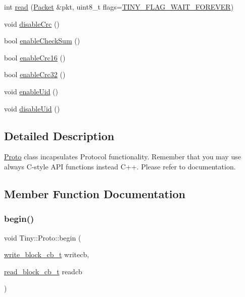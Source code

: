 \begin{DoxyCompactItemize}
\item 
int \hyperlink{classTiny_1_1Proto_aedef629f8b8968db7c8693bb45039651}{read} (\hyperlink{classTiny_1_1Packet}{Packet} \&pkt, uint8\+\_\+t flags=\hyperlink{group__FLAGS__GROUP_ga3a34267804581c5709d03f52d232b307}{T\+I\+N\+Y\+\_\+\+F\+L\+A\+G\+\_\+\+W\+A\+I\+T\+\_\+\+F\+O\+R\+E\+V\+ER})
\item 
void \hyperlink{classTiny_1_1Proto_a8992983d7ada115b0aa24db41594947c}{disable\+Crc} ()
\item 
bool \hyperlink{classTiny_1_1Proto_abb6cbae9a9944dc9ae0d756554f65a52}{enable\+Check\+Sum} ()
\item 
bool \hyperlink{classTiny_1_1Proto_a794afcac2ca15544247c34b059bc1289}{enable\+Crc16} ()
\item 
bool \hyperlink{classTiny_1_1Proto_a2ef1c80490d9343b896180ab8b8a6f77}{enable\+Crc32} ()
\item 
void \hyperlink{classTiny_1_1Proto_a9fdd64b8296e27f3205cd0d3ea685eac}{enable\+Uid} ()
\item 
void \hyperlink{classTiny_1_1Proto_aff9f3c59f58a8ca527ad0254ab806c5c}{disable\+Uid} ()
\end{DoxyCompactItemize}


\subsection{Detailed Description}
\hyperlink{classTiny_1_1Proto}{Proto} class incapsulates Protocol functionality. Remember that you may use always C-\/style A\+PI functions instead C++. Please refer to documentation. 

\subsection{Member Function Documentation}
\mbox{\label{classTiny_1_1Proto_a6f5f4ebec42dc6e679c25e79284d7705}} 
\subsubsection{\texorpdfstring{begin()}{begin()}}
{\footnotesize\ttfamily void Tiny\+::\+Proto\+::begin (\begin{DoxyParamCaption}\item[{\hyperlink{tiny__proto__types_8h_aafd634660bba76cace57a8f9b01e044d}{write\+\_\+block\+\_\+cb\+\_\+t}}]{writecb,  }\item[{\hyperlink{tiny__proto__types_8h_a15bec127d9ee63658563d62e92b5261b}{read\+\_\+block\+\_\+cb\+\_\+t}}]{readcb }\end{DoxyParamCaption})}

